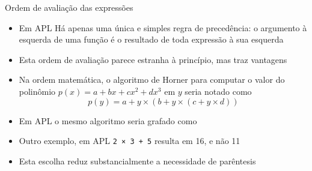 \begin{frame}[fragile]{Ordem de avaliação das expressões}

    \begin{itemize}
        \item Em APL Há apenas uma única e simples regra de precedência: o argumento à esquerda de uma função é o resultado de toda expressão à sua esquerda
        \pause

        \item Esta ordem de avaliação parece estranha à princípio, mas traz vantagens
        \pause

        \item Na ordem matemática, o algoritmo de Horner para computar o valor do polinômio $p(x) = a + bx + cx^2 + dx^3$ em $y$ seria notado como
        \[
            p(y) = a + y \times (b + y \times (c + y \times d))
        \]

        \pause \item Em APL o mesmo algoritmo seria grafado como

        \pause

        \item Outro exemplo, em APL \texttt{2 × 3 + 5} resulta em 16, e não 11
        \pause

        \item Esta escolha reduz substancialmente a necessidade de parêntesis
    \end{itemize}

\end{frame}

